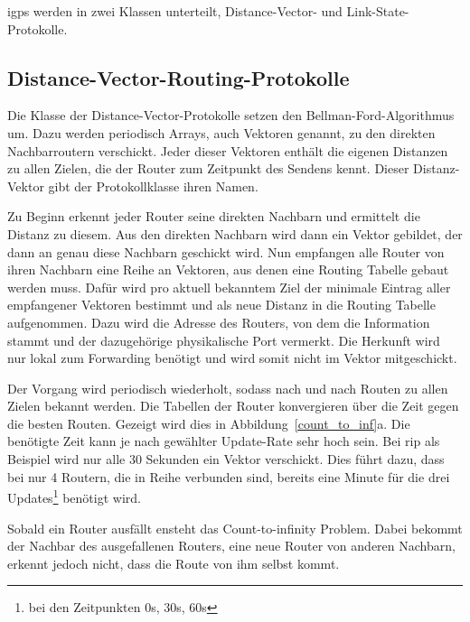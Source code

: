 \documentclass[11pt,a4paper,final]{article}
\begin{document}
\ac{igp}s werden in zwei Klassen unterteilt, Distance-Vector- und Link-State-Protokolle.
\subsection{Distance-Vector-Routing-Protokolle}
Die Klasse der Distance-Vector-Protokolle setzen den Bellman-Ford-Algorithmus um. Dazu werden periodisch Arrays, auch Vektoren genannt, zu den direkten Nachbarroutern verschickt. Jeder dieser Vektoren enthält die eigenen Distanzen zu allen Zielen, die der Router zum Zeitpunkt des Sendens kennt. Dieser Distanz-Vektor gibt der Protokollklasse ihren Namen.

Zu Beginn erkennt jeder Router seine direkten Nachbarn und ermittelt die Distanz zu diesem. Aus den direkten Nachbarn wird dann ein Vektor gebildet, der dann an genau diese Nachbarn geschickt wird. Nun empfangen alle Router von ihren Nachbarn eine Reihe an Vektoren, aus denen eine Routing Tabelle gebaut werden muss. Dafür wird pro aktuell bekanntem Ziel der minimale Eintrag aller empfangener Vektoren bestimmt und als neue Distanz in die Routing Tabelle aufgenommen. Dazu wird die Adresse des Routers, von dem die Information stammt und der dazugehörige physikalische Port vermerkt. Die Herkunft wird nur lokal zum Forwarding benötigt und wird somit nicht im Vektor mitgeschickt.

Der Vorgang wird periodisch wiederholt, sodass nach und nach Routen zu allen Zielen bekannt werden. Die Tabellen der Router konvergieren über die Zeit gegen die besten Routen. Gezeigt wird dies in Abbildung~\ref{count_to_inf}a. Die benötigte Zeit kann je nach gewählter Update-Rate sehr hoch sein. Bei \ac{rip} als Beispiel wird nur alle 30 Sekunden ein Vektor verschickt. Dies führt dazu, dass bei nur 4 Routern, die in Reihe verbunden sind, bereits eine Minute für  die drei Updates\footnote{bei den Zeitpunkten 0s, 30s, 60s} benötigt wird.

Sobald ein Router ausfällt ensteht das Count-to-infinity Problem. Dabei bekommt der Nachbar des ausgefallenen Routers, eine neue Router von anderen Nachbarn, erkennt jedoch nicht, dass die Route von ihm selbst kommt.
\end{document}

